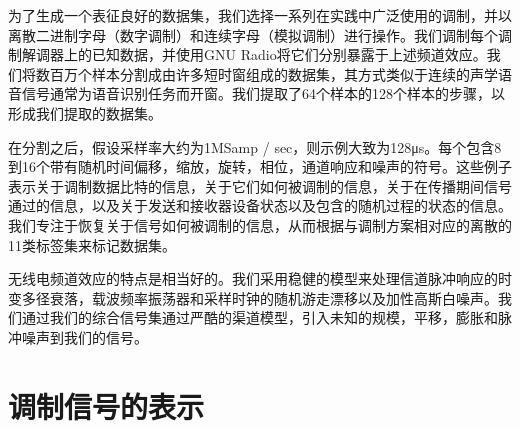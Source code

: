 为了生成一个表征良好的数据集，我们选择一系列在实践中广泛使用的调制，并以离散二进制字母（数字调制）和连续字母（模拟调制）进行操作。我们调制每个调制解调器上的已知数据，并使用GNU Radio将它们分别暴露于上述频道效应。我们将数百万个样本分割成由许多短时窗组成的数据集，其方式类似于连续的声学语音信号通常为语音识别任务而开窗。我们提取了64个样本的128个样本的步骤，以形成我们提取的数据集。\par

在分割之后，假设采样率大约为1MSamp / sec，则示例大致为128μs。每个包含8到16个带有随机时间偏移，缩放，旋转，相位，通道响应和噪声的符号。这些例子表示关于调制数据比特的信息，关于它们如何被调制的信息，关于在传播期间信号通过的信息，以及关于发送和接收器设备状态以及包含的随机过程的状态的信息。我们专注于恢复关于信号如何被调制的信息，从而根据与调制方案相对应的离散的11类标签集来标记数据集。\par


无线电频道效应的特点是相当好的。我们采用稳健的模型来处理信道脉冲响应的时变多径衰落，载波频率振荡器和采样时钟的随机游走漂移以及加性高斯白噪声。我们通过我们的综合信号集通过严酷的渠道模型，引入未知的规模，平移，膨胀和脉冲噪声到我们的信号。\par

\section{调制信号的表示}

